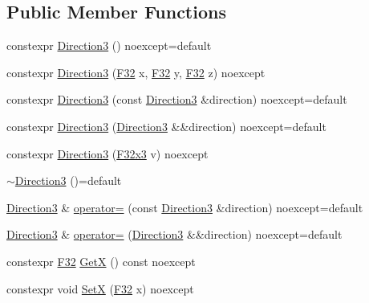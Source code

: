 \subsection*{Public Member Functions}
\begin{DoxyCompactItemize}
\item 
constexpr \mbox{\hyperlink{structmage_1_1_direction3_a64dd4745147f5fd39f710e8b9591074a}{Direction3}} () noexcept=default
\item 
constexpr \mbox{\hyperlink{structmage_1_1_direction3_a880d7413dc6f3742b53a089b870018c7}{Direction3}} (\mbox{\hyperlink{namespacemage_aa97e833b45f06d60a0a9c4fc22ae02c0}{F32}} x, \mbox{\hyperlink{namespacemage_aa97e833b45f06d60a0a9c4fc22ae02c0}{F32}} y, \mbox{\hyperlink{namespacemage_aa97e833b45f06d60a0a9c4fc22ae02c0}{F32}} z) noexcept
\item 
constexpr \mbox{\hyperlink{structmage_1_1_direction3_ad4d5801c6ad4949e0c7b0f4e2fec0ed9}{Direction3}} (const \mbox{\hyperlink{structmage_1_1_direction3}{Direction3}} \&direction) noexcept=default
\item 
constexpr \mbox{\hyperlink{structmage_1_1_direction3_aff1506b32f2b6dd49c2747eca90c76ce}{Direction3}} (\mbox{\hyperlink{structmage_1_1_direction3}{Direction3}} \&\&direction) noexcept=default
\item 
constexpr \mbox{\hyperlink{structmage_1_1_direction3_a9ef3fe2fd9fd55fade378d42eda597c3}{Direction3}} (\mbox{\hyperlink{namespacemage_a0fef5ab4e073c2d9ea876fefa3da4233}{F32x3}} v) noexcept
\item 
\mbox{\hyperlink{structmage_1_1_direction3_a583c087dc366d206aaf54a33bc90c50b}{$\sim$\+Direction3}} ()=default
\item 
\mbox{\hyperlink{structmage_1_1_direction3}{Direction3}} \& \mbox{\hyperlink{structmage_1_1_direction3_a3bbb78215de8d52528c15c2e150d4a53}{operator=}} (const \mbox{\hyperlink{structmage_1_1_direction3}{Direction3}} \&direction) noexcept=default
\item 
\mbox{\hyperlink{structmage_1_1_direction3}{Direction3}} \& \mbox{\hyperlink{structmage_1_1_direction3_a02823d74126254434d8288f103e67fe6}{operator=}} (\mbox{\hyperlink{structmage_1_1_direction3}{Direction3}} \&\&direction) noexcept=default
\item 
constexpr \mbox{\hyperlink{namespacemage_aa97e833b45f06d60a0a9c4fc22ae02c0}{F32}} \mbox{\hyperlink{structmage_1_1_direction3_a8d3ec6086f1b47844331950df3a47207}{GetX}} () const noexcept
\item 
constexpr void \mbox{\hyperlink{structmage_1_1_direction3_a0c2b501a6e30261d872227bb73be8914}{SetX}} (\mbox{\hyperlink{namespacemage_aa97e833b45f06d60a0a9c4fc22ae02c0}{F32}} x) noexcept

\end{DoxyCompactItemize}
